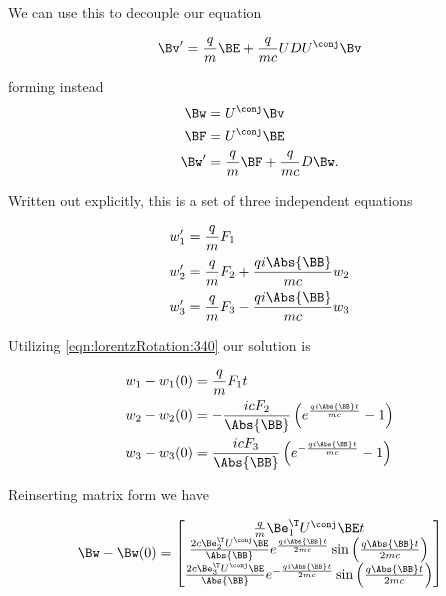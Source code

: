 We can use this to decouple our equation

\begin{equation}\label{eqn:lorentzRotation:480}
\Bv' = \frac{q}{m} \BE + \frac{q}{ m c } U D U^\conj \Bv
\end{equation}

forming instead
\begin{align}\label{eqn:lorentzRotation:500}
\Bw &= U^\conj \Bv \\
\BF &= U^\conj \BE \\
\Bw' &= \frac{q}{m} \BF + \frac{q}{ m c } D \Bw.
\end{align}

Written out explicitly, this is a set of three independent equations

\begin{align}\label{eqn:lorentzRotation:520}
w_1' &= \frac{q}{m} F_1 \\
w_2' &= \frac{q}{m} F_2 + \frac{q i \Abs{\BB}}{ m c } w_2 \\
w_3' &= \frac{q}{m} F_3 - \frac{q i \Abs{\BB}}{ m c } w_3
\end{align}

Utilizing \ref{eqn:lorentzRotation:340} our solution is

\begin{align}\label{eqn:lorentzRotation:520}
w_1 - w_1(0) &= \frac{q}{m} F_1 t \\
w_2 - w_2(0) &= - \frac{i c F_2 }{\Abs{\BB}} \left( e^{ \frac{q i \Abs{\BB} t}{ m c } } - 1 \right) \\
w_3 - w_3(0) &= \frac{i c F_3 }{\Abs{\BB}} \left( e^{ -\frac{q i \Abs{\BB} t}{ m c } } - 1 \right)
\end{align}

Reinserting matrix form we have

\begin{equation}\label{eqn:lorentzRotation:n}
\Bw - \Bw(0) =
\begin{bmatrix}
\frac{q}{m} \Be_1^\T U^\conj \BE t \\
\frac{2 c \Be_2^\T U^\conj \BE }{\Abs{\BB}}
e^{ \frac{q i \Abs{\BB} t}{ 2 m c } } \sin \left( \frac{q \Abs{\BB} t}{ 2 m c } \right) \\
\frac{2 c \Be_3^\T U^\conj \BE }{\Abs{\BB}}
e^{ -\frac{q i \Abs{\BB} t}{ 2 m c } } \sin \left( \frac{q \Abs{\BB} t}{ 2 m c } \right) \\
\end{bmatrix}
\end{equation}

